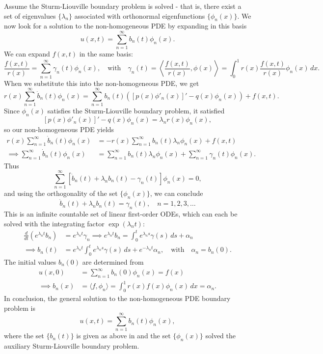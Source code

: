 \begin{eg}
	Assume the Sturm-Liouville boundary problem is solved - that is, there exist a set of eigenvalues $\{\lambda_n\}$ associated with orthonormal eigenfunctions $\{\phi_n(x)\}$. We now look for a solution to the non-homogeneous PDE by expanding in this basis
	\[
		u(x,t) = \sum_{n=1}^{\infty} b_n(t) \phi_n(x).
	\]
	We can expand $f(x,t)$ in the same basis:
	\[
		\frac{f(x,t)}{r(x)} = \sum_{n=1}^{\infty} \gamma_n(t) \phi_n(x), \quad\text{with}\quad \gamma_n(t) = \left\langle \frac{f(x,t)}{r(x)}, \phi(x) \right\rangle = \int_0^1 r(x) \frac{f(x,t)}{r(x)} \phi_n(x) \,dx.
	\]
	When we substitute this into the non-homogeneous PDE, we get
	\[
		r(x) \sum_{n=1}^{\infty} \dot{b}_n(t) \phi_n(x) = \sum_{n=1}^{\infty} b_n(t) \left([p(x)\phi'_n(x)]' - q(x)\phi_n(x)\right) + f(x,t).
	\]
	Since $\phi_n(x)$ satisfies the Sturm-Liouville boundary problem, it satisfied
	\[
		[p(x)\phi'_n(x)]' - q(x)\phi_n(x) = \lambda_n r(x) \phi_n(x),
	\]
	so our non-homogeneous PDE yields
	\begin{align*}
		r(x) \sum_{n=1}^{\infty} \dot{b}_n(t) \phi_n(x) &= -r(x)\sum_{n=1}^{\infty} b_n(t) \lambda_n \phi_n(x) + f(x,t) \\
		\implies \sum_{n=1}^{\infty} \dot{b}_n(t) \phi_n(x) &= \sum_{n=1}^{\infty} b_n(t) \lambda_n \phi_n(x) + \sum_{n=1}^{\infty} \gamma_n(t) \phi_n(x).
	\end{align*}
	Thus
	\[
		\sum_{n=1}^{\infty} \left[\dot{b}_n(t) + \lambda_n b_n(t) - \gamma_n(t)\right] \phi_n(x) = 0,
	\]
	and using the orthogonality of the set $\{\phi_n(x)\}$, we can conclude
	\[
		\dot{b}_n(t) + \lambda_n b_n(t) = \gamma_n(t), \quad n = 1, 2, 3, \ldots
	\]
	This is an infinite countable set of linear first-order ODEs, which can each be solved with the integrating factor $\exp(\lambda_n t)$:
	\begin{align}
		\frac{d}{dt}(e^{\lambda_n t}b_n) &= e^{\lambda_n t}\gamma_n \implies e^{\lambda_n t}b_n = \int_0^t e^{\lambda_n s}\gamma(s) \,ds + \alpha_n \nonumber \\
		\label{eq:slpdesbn}
		\implies b_n(t) &= e^{\lambda_n t} \int_0^t e^{\lambda_n s}\gamma(s) \,ds + e^{-\lambda_n t}\alpha_n, \quad\text{with}\quad \alpha_n = b_n(0).
	\end{align}
	The initial values $b_n(0)$ are determined from
	\begin{align*}
		u(x,0) &= \sum_{n=1}^{\infty} b_n(0)\phi_n(x) = f(x) \\
		\implies b_n(x) &= \langle f, \phi_n\rangle = \int_0^1 r(x)f(x)\phi_n(x)\,dx = \alpha_n.
	\end{align*}
	In conclusion, the general solution to the non-homogeneous PDE boundary problem is
	\[
		u(x,t) = \sum_{n=1}^{\infty} b_n(t)\phi_n(x),
	\]
	where the set $\{b_n(t)\}$ is given as above in  and the set $\{\phi_n(x)\}$ solved the auxiliary Sturm-Liouville boundary problem.
\end{eg}

